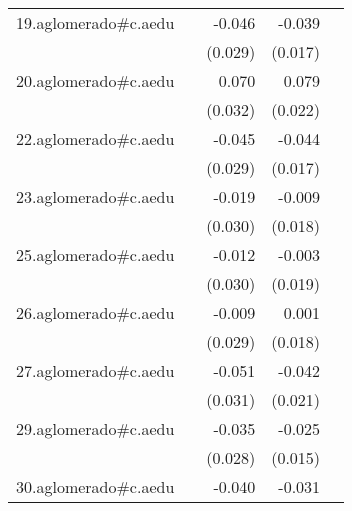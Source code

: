 {\begin{longtable}{l*{4}{D{.}{.}{-1}}}
\addlinespace
19.aglomerado#c.aedu&                     &      -0.046         &      -0.039\sym{*}  &                     \\
            &                     &     (0.029)         &     (0.017)         &                     \\
\addlinespace
20.aglomerado#c.aedu&                     &       0.070\sym{*}  &       0.079\sym{***}&                     \\
            &                     &     (0.032)         &     (0.022)         &                     \\
\addlinespace
22.aglomerado#c.aedu&                     &      -0.045         &      -0.044\sym{*}  &                     \\
            &                     &     (0.029)         &     (0.017)         &                     \\
\addlinespace
23.aglomerado#c.aedu&                     &      -0.019         &      -0.009         &                     \\
            &                     &     (0.030)         &     (0.018)         &                     \\
\addlinespace
25.aglomerado#c.aedu&                     &      -0.012         &      -0.003         &                     \\
            &                     &     (0.030)         &     (0.019)         &                     \\
\addlinespace
26.aglomerado#c.aedu&                     &      -0.009         &       0.001         &                     \\
            &                     &     (0.029)         &     (0.018)         &                     \\
\addlinespace
27.aglomerado#c.aedu&                     &      -0.051         &      -0.042\sym{*}  &                     \\
            &                     &     (0.031)         &     (0.021)         &                     \\
\addlinespace
29.aglomerado#c.aedu&                     &      -0.035         &      -0.025         &                     \\
            &                     &     (0.028)         &     (0.015)         &                     \\
\addlinespace
30.aglomerado#c.aedu&                     &      -0.040         &      -0.031         &                     \\

\end{longtable}}
